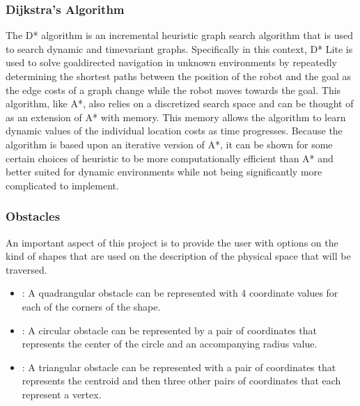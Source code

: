 \documentclass[letterpaper,10pt,english]{sphinxmanual}
\begin{document}
\subsubsection{Dijkstra’s Algorithm}
\label{\detokenize{background_science:dijkstra-s-algorithm}}
\sphinxAtStartPar
The D* algorithm is an incremental heuristic graph search algorithm that is used to search dynamic and time\sphinxhyphen{}variant graphs. Specifically in this context, D* Lite is used to solve goal\sphinxhyphen{}directed navigation in unknown environments by repeatedly determining the shortest paths between the position of the robot and the goal as the edge costs of a graph change while the robot moves towards the goal. This algorithm, like A*, also relies on a discretized search space and can be thought of as an extension of A* with memory. This memory allows the algorithm to learn dynamic values of the individual location costs as time progresses. Because the algorithm is based upon an iterative version of A*, it can be shown for some certain choices of heuristic to be more computationally efficient than A* and better suited for dynamic environments while not being significantly more complicated to implement.


\subsubsection{Obstacles}
\label{\detokenize{background_science:obstacles}}
\sphinxAtStartPar
An important aspect of this project is to provide the user with options on the kind of shapes that are used on the description of the physical space that will be traversed.
\begin{itemize}
\item {} 
\sphinxAtStartPar
{}: A quadrangular obstacle can be represented with 4 coordinate values for each of the corners of the shape.

\item {} 
\sphinxAtStartPar
{}: A circular obstacle can be represented by a pair of coordinates that represents the center of the circle and an accompanying radius value.

\item {} 
\sphinxAtStartPar
{}: A triangular obstacle can be represented with a pair of coordinates that represents the centroid and then three other pairs of coordinates that each represent a vertex.

\end{itemize}
\end{document}
